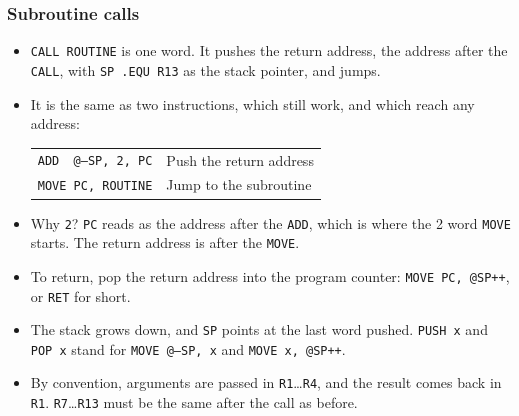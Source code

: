 \documentclass{beamer}
\newcommand{\code}[1]{\texttt{#1}}
\begin{document}
   \begin{frame}
    \frametitle{Subroutine calls}
    \begin{itemize}
     \item \code{CALL ROUTINE} is one word. It pushes the return address,
      the address after the \code{CALL}, with \mbox{\code{SP .EQU R13}} as
      the stack pointer, and jumps.
     \item It is the same as two instructions, which still work, and which
      reach any address:
      \begin{center}
       \begin{tabular}{ll}
        \code{ADD ~@--SP, 2, PC}&Push the return address\\
        \code{MOVE PC, ROUTINE}&Jump to the subroutine\\
       \end{tabular}
      \end{center}
     \item Why \code{2}? \code{PC} reads as the address after the
      \code{ADD}, which is where the 2 word \code{MOVE} starts. The return
      address is after the \code{MOVE}.
     \item To return, pop the return address into the program counter:
      \code{MOVE PC, @SP++}, or \code{RET} for short.
     \item The stack grows down, and \code{SP} points at the last word
      pushed. \code{PUSH x} and \code{POP x} stand for
      \code{MOVE @--SP, x} and \code{MOVE x, @SP++}.
     \item By convention, arguments are passed in \code{R1}\dots\code{R4},
      and the result comes back in \code{R1}. \code{R7}\dots\code{R13} must
      be the same after the call as before.
    \end{itemize}
   \end{frame}
%
\end{document}
